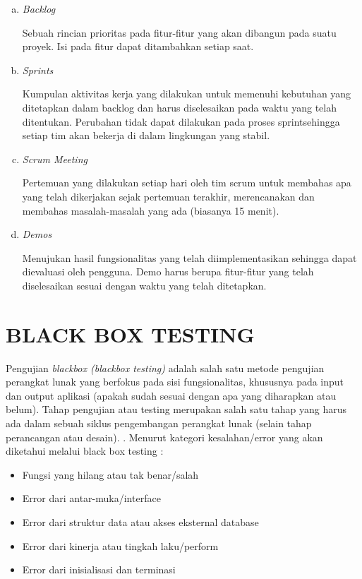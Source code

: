 \begin{enumerate}[a.]
\item \textit{Backlog}
 \par Sebuah rincian prioritas pada fitur-fitur yang akan dibangun pada suatu proyek. Isi pada fitur dapat ditambahkan setiap saat. 
 \item \textit{Sprints} 
 \par Kumpulan aktivitas kerja yang dilakukan untuk memenuhi kebutuhan yang ditetapkan dalam backlog dan harus diselesaikan pada waktu yang telah ditentukan. Perubahan tidak dapat dilakukan pada proses sprintsehingga setiap tim akan bekerja di dalam lingkungan yang stabil. 
 \item \textit{Scrum Meeting} 
 \par Pertemuan yang dilakukan setiap hari oleh tim scrum untuk membahas apa yang telah dikerjakan sejak pertemuan terakhir, merencanakan dan membahas masalah-masalah yang ada (biasanya 15 menit).
 \item \textit{Demos} 
 \par Menujukan hasil fungsionalitas yang telah diimplementasikan sehingga dapat dievaluasi oleh pengguna. 
 Demo harus berupa fitur-fitur yang telah diselesaikan sesuai dengan waktu yang telah ditetapkan. 
\end{enumerate}

\section{\uppercase{Black Box Testing}}
Pengujian \textit{blackbox (blackbox testing)} adalah salah satu metode pengujian perangkat lunak yang berfokus pada sisi fungsionalitas, khususnya pada input dan output aplikasi (apakah sudah sesuai dengan apa yang diharapkan atau belum). Tahap pengujian atau testing merupakan salah satu tahap yang harus ada dalam sebuah siklus pengembangan perangkat lunak (selain tahap perancangan atau desain). \citep{iskandaria2012}. Menurut \cite{shihab2011} kategori kesalahan/error yang akan diketahui melalui black box testing :

\begin{itemize}
\item Fungsi yang hilang atau tak benar/salah
\item Error dari antar-muka/interface
\item Error dari struktur data atau akses eksternal database
\item Error dari kinerja atau tingkah laku/perform
\item Error dari inisialisasi dan terminasi
\end{itemize}


